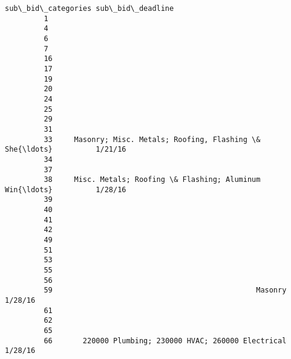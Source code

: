 \documentclass[11pt]{article}
\begin{document}
\begin{Verbatim}[commandchars=\\\{\}]
                                               sub\_bid\_categories sub\_bid\_deadline  
         1                                                                          
         4                                                                          
         6                                                                          
         7                                                                          
         16                                                                         
         17                                                                         
         19                                                                         
         20                                                                         
         24                                                                         
         25                                                                         
         29                                                                         
         31                                                                         
         33     Masonry; Misc. Metals; Roofing, Flashing \& She{\ldots}          1/21/16  
         34                                                                         
         37                                                                         
         38     Misc. Metals; Roofing \& Flashing; Aluminum Win{\ldots}          1/28/16  
         39                                                                         
         40                                                                         
         41                                                                         
         42                                                                         
         49                                                                         
         51                                                                         
         53                                                                         
         55                                                                         
         56                                                                         
         59                                               Masonry          1/28/16  
         61                                                                         
         62                                                                         
         65                                                                         
         66       220000 Plumbing; 230000 HVAC; 260000 Electrical          1/28/16  

\end{Verbatim}
\end{document}
